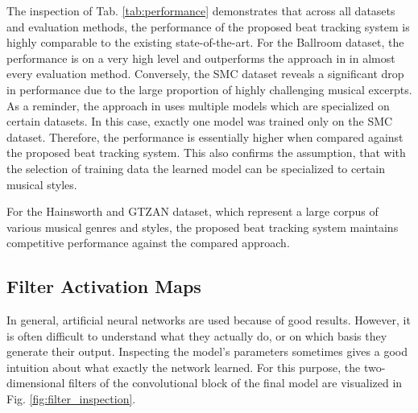 \documentclass{scrartcl}
\begin{document}
The inspection of Tab. \ref{tab:performance} demonstrates that across all datasets and evaluation methods, the performance of the proposed beat tracking system is highly comparable to the existing state-of-the-art. For the Ballroom dataset, the performance is on a very high level and outperforms the approach in \cite{Boeck2014} in almost every evaluation method. Conversely, the SMC dataset reveals a significant drop in performance due to the large proportion of highly challenging musical excerpts. As a reminder, the approach in \cite{Boeck2014} uses multiple models which are specialized on certain datasets. In this case, exactly one model was trained only on the SMC dataset. Therefore, the performance is essentially higher when compared against the proposed beat tracking system. This also confirms the assumption, that with the selection of training data the learned model can be specialized to certain musical styles. 

For the Hainsworth and GTZAN dataset, which  represent a large corpus of various musical genres and styles, the proposed beat tracking system maintains competitive performance against the compared approach. 

\newpage


\subsection{Filter Activation Maps}
In general, artificial neural networks are used because of good results. However, it is often difficult to understand what they actually do, or on which basis they generate their output. Inspecting the model's parameters sometimes gives a good intuition about what exactly the network learned. For this purpose, the two-dimensional filters of the convolutional block of the final model are visualized in Fig. \ref{fig:filter_inspection}.
\end{document}
